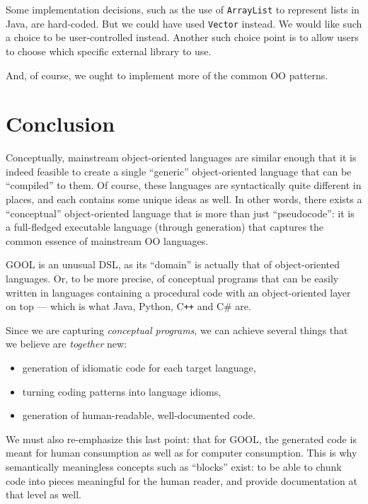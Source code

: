 \documentclass[sigplan,review,anonymous,prologue,dvipsnames]{acmart}
\newcommand{\Csharp}{C\#}
\newcommand{\Cplusplus}{C\texttt{++}}
\begin{document}
Some implementation decisions, such as the use of \verb|ArrayList| to represent
lists in Java, are hard-coded. But we could have used \verb|Vector| instead.
We would like such a choice to be user-controlled instead. Another such choice
point is to allow users to choose which specific external library to use.

And, of course, we ought to implement more of the common OO patterns.

\section{Conclusion} \label{sec:conclusions}

Conceptually, mainstream object-oriented languages are similar enough that it
is indeed feasible to create a single ``generic'' object-oriented language that
can be ``compiled'' to them.  Of course, these languages are syntactically
quite different in places, and each contains some unique ideas as well.
In other words, there exists a ``conceptual'' object-oriented language that
is more than just ``pseudocode'': it is a full-fledged executable language
(through generation) that captures the common essence of mainstream OO
languages.

GOOL is an unusual DSL, as its ``domain'' is actually that of object-oriented
languages. Or, to be more precise, of conceptual programs that can be
easily written in languages containing a procedural code with an
object-oriented layer on top --- which is what Java, Python, \Cplusplus{} and
\Csharp{} are.

Since we are capturing \emph{conceptual programs}, we can achieve
several things that we believe are \emph{together} new:
\begin{itemize}
\item generation of idiomatic code for each target language,
\item turning coding patterns into language idioms,
\item generation of human-readable, well-documented code.
\end{itemize}

We must also re-emphasize this last point: that for GOOL, the generated code
is meant for human consumption as well as for computer consumption. This is
why semantically meaningless concepts such as ``blocks'' exist: to be able
to chunk code into pieces meaningful for the human reader, and provide
documentation at that level as well.






% 
% 
\end{document}
